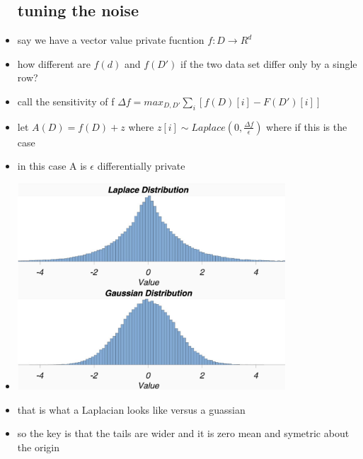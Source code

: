 \documentclass{article}
\begin{document}
\begin{itemize}
\subsection*{tuning the noise}
\item say we have a vector value private fucntion $f:D\rightarrow R^{d}$
\item how different are $f(d)$ and $f(D')$ if the two data set differ only by a single row? 
\item call the sensitivity of f $\Delta f= max_{D,D'}\sum_{i}[f(D)[i]-F(D')[i]]$
\item let $A(D)=f(D)+z$ where $z[i]\sim Laplace(0,\frac{\Delta f}{\epsilon})$ where if this is the case 
\item in this case A is $\epsilon$ differentially private 
\item \includegraphics*[width=10cm]{images/Screenshot 2023-05-11 at 10.28.35 PM.png}
\item that is what a Laplacian looks like versus a guassian 
\item so the key is that the tails are wider and it is zero mean and symetric about the origin 

\end{itemize}
\end{document}
